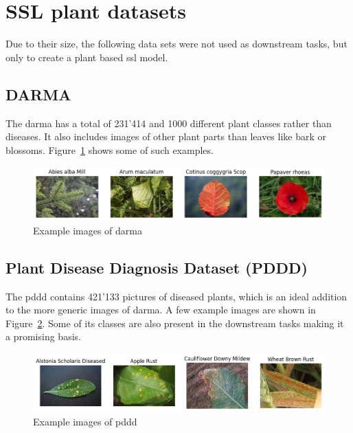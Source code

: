 \section{SSL plant datasets}

Due to their size, the following data sets were not used as downstream tasks, but only to create a plant based \gls{ssl} model. 
\subsection{DARMA}
The \gls{darma} has a total of 231'414 and 1000 different plant classes rather than diseases. It also includes images of other plant parts than leaves like bark or blossoms. Figure~\ref{fig:example_images_of_darma} shows some of such examples.

\begin{figure}[H]
    \begin{center}
    \includegraphics[width=15cm]{../../images/example_images_of_darma.png}
    \caption{Example images of \gls{darma}}\label{fig:example_images_of_darma}
    \end{center}
\end{figure}

\subsection{Plant Disease Diagnosis Dataset (PDDD)}
The \gls{pddd} contains 421'133 pictures of diseased plants, which is an ideal addition to the more generic images of \gls{darma}.
A few example images are shown in Figure~\ref{fig:example_images_of_pddd}. Some of its classes are also present in the downstream tasks making it a promising basis.
\begin{figure}[H]
    \begin{center}
    \includegraphics[width=15cm]{../../images/example_images_of_pddd.png}
    \caption{Example images of \gls{pddd}}\label{fig:example_images_of_pddd}
    \end{center}
\end{figure}

